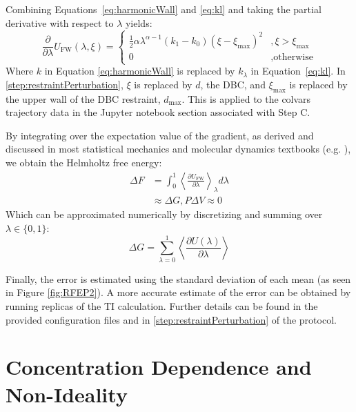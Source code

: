 \documentclass[9pt,tutorial]{Styling/livecoms}
\begin{document}
Combining Equations~\ref{eq:harmonicWall} and \ref{eq:kl} and taking the partial derivative with respect to $\lambda$ yields:
\begin{equation}\label{eq:dUwalldlambda}
    \frac{\partial}{\partial \lambda} U_\mathrm{FW}(\lambda, \xi) =\begin{cases}
        \frac{1}{2}\alpha\lambda^{\alpha-1}(k_1 - k_0)(\xi-\xi_\mathrm{max})^2&, \xi>\xi_\mathrm{max}\\
        0 &, \text{otherwise}
    \end{cases} 
\end{equation}
Where $k$ in Equation \ref{eq:harmonicWall} is replaced by $k_\lambda$ in Equation~\ref{eq:kl}.
In \ref{step:restraintPerturbation}, $\xi$ is replaced by $d$, the DBC, and $\xi_\mathrm{max}$ is replaced by the upper wall of the DBC restraint, $d_\mathrm{max}$.
This is applied to the colvars trajectory data in the Jupyter notebook section associated with Step C. 

By integrating over the expectation value of the gradient, as derived and discussed in most statistical mechanics and molecular dynamics textbooks (e.g. \cite{Tuckerman2010, frenkel2001understanding}), we obtain the Helmholtz free energy:
\begin{align}\label{eq:thermodynamicintegration}
    \Delta F &= \int_{0}^{1} \left< \frac{\partial U_\mathrm{FW}}{\partial \lambda} \right>_{\lambda} d\lambda\\
    &\approx \Delta G , P\Delta V \approx 0
\end{align}
Which can be approximated numerically by discretizing and summing over $\lambda\in\{0,1\}$:
\begin{equation} \label{eq:TI}
    \Delta G = \sum_{\lambda=0}^1 \left\langle
    \frac{\partial U(\lambda)}{\partial \lambda}\right\rangle
\end{equation}

Finally, the error is estimated using the standard deviation of each mean (as seen in Figure \ref{fig:RFEP2}). A more accurate estimate of the error can be obtained by running replicas of the TI calculation. 
Further details can be found in the provided configuration files and in \ref{step:restraintPerturbation} of the protocol.


\section{Concentration Dependence and Non-Ideality} \label{app:bindingProbability}
\end{document}
